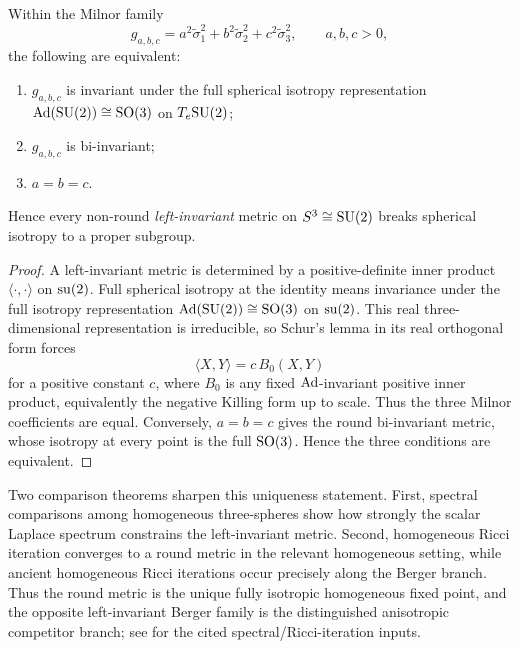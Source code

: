 \documentclass[11pt]{article}
\begin{document}
\begin{proposition}
\label{p1a:proposition:atlas-full-isotropy-forces-roundness-b0fac04}

Within the Milnor family
\[
g_{a,b,c}=a^2\tilde\sigma_1^2+b^2\tilde\sigma_2^2+c^2\tilde\sigma_3^2,
\qquad a,b,c>0,
\]
the following are equivalent:
\begin{enumerate}[label=(\roman*)]
\item \(g_{a,b,c}\) is invariant under the full spherical isotropy representation \(\operatorname{Ad}(\mathrm{SU}(2))\cong\mathrm{SO}(3)\) on \(T_e\mathrm{SU}(2)\);
\item \(g_{a,b,c}\) is bi-invariant;
\item \(a=b=c\).
\end{enumerate}
Hence every non-round \emph{left-invariant} metric on \(S^3\cong \mathrm{SU}(2)\) breaks spherical isotropy to a proper subgroup.
\end{proposition}

\begin{proof}
A left-invariant metric is determined by a positive-definite inner product
\(\langle\cdot,\cdot\rangle\) on \(\operatorname{su}(2)\).  Full spherical isotropy at the
identity means invariance under the full isotropy representation
\(\operatorname{Ad}(\mathrm{SU}(2))\cong \mathrm{SO}(3)\) on \(\operatorname{su}(2)\).  This real three-dimensional
representation is irreducible, so Schur's lemma in its real orthogonal form
forces
\[
    \langle X,Y\rangle=c\,B_0(X,Y)
\]
for a positive constant \(c\), where \(B_0\) is any fixed \(\operatorname{Ad}\)-invariant
positive inner product, equivalently the negative Killing form up to scale.
Thus the three Milnor coefficients are equal.  Conversely, \(a=b=c\) gives the
round bi-invariant metric, whose isotropy at every point is the full
\(\mathrm{SO}(3)\).  Hence the three conditions are equivalent.
\end{proof}

\begin{remark}
Two comparison theorems sharpen this uniqueness statement. First, spectral comparisons among homogeneous three-spheres show how strongly the scalar Laplace spectrum constrains the left-invariant metric. Second, homogeneous Ricci iteration converges to a round metric in the relevant homogeneous setting, while ancient homogeneous Ricci iterations occur precisely along the Berger branch. Thus the round metric is the unique fully isotropic homogeneous fixed point, and the opposite left-invariant Berger family is the distinguished anisotropic competitor branch; see \cite{lauret2019smallest,buttsworth2021ricciiteration} for the cited spectral/Ricci-iteration inputs.
\end{remark}
\end{document}
